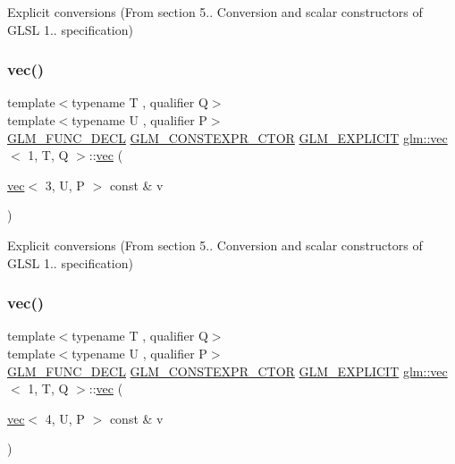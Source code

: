 Explicit conversions (From section 5.. Conversion and scalar constructors of G\+L\+SL 1.. specification) 

\mbox{\label{structglm_1_1vec_3_011_00_01_t_00_01_q_01_4_ab2af72d32392be4ad056d846d6552a85}} 
\subsubsection{\texorpdfstring{vec()}{vec()}\hspace{0.1cm}{\footnotesize\ttfamily [6/14]}}
{\footnotesize\ttfamily template$<$typename T , qualifier Q$>$ \\
template$<$typename U , qualifier P$>$ \\
\hyperlink{setup_8hpp_ab2d052de21a70539923e9bcbf6e83a51}{G\+L\+M\+\_\+\+F\+U\+N\+C\+\_\+\+D\+E\+CL} \hyperlink{setup_8hpp_ad34178a09666081abdb573c14d1f4a5a}{G\+L\+M\+\_\+\+C\+O\+N\+S\+T\+E\+X\+P\+R\+\_\+\+C\+T\+OR} \hyperlink{setup_8hpp_a6c74f5a5e7b134ab69023ff9a30d4d5d}{G\+L\+M\+\_\+\+E\+X\+P\+L\+I\+C\+IT} \hyperlink{structglm_1_1vec}{glm\+::vec}$<$ 1, T, Q $>$\+::\hyperlink{structglm_1_1vec}{vec} (\begin{DoxyParamCaption}\item[{\hyperlink{structglm_1_1vec}{vec}$<$ 3, U, P $>$ const \&}]{v }\end{DoxyParamCaption})}



Explicit conversions (From section 5.. Conversion and scalar constructors of G\+L\+SL 1.. specification) 

\mbox{\label{structglm_1_1vec_3_011_00_01_t_00_01_q_01_4_afe3da36b0ef8bf292c65f2846dc6db9a}} 
\subsubsection{\texorpdfstring{vec()}{vec()}\hspace{0.1cm}{\footnotesize\ttfamily [7/14]}}
{\footnotesize\ttfamily template$<$typename T , qualifier Q$>$ \\
template$<$typename U , qualifier P$>$ \\
\hyperlink{setup_8hpp_ab2d052de21a70539923e9bcbf6e83a51}{G\+L\+M\+\_\+\+F\+U\+N\+C\+\_\+\+D\+E\+CL} \hyperlink{setup_8hpp_ad34178a09666081abdb573c14d1f4a5a}{G\+L\+M\+\_\+\+C\+O\+N\+S\+T\+E\+X\+P\+R\+\_\+\+C\+T\+OR} \hyperlink{setup_8hpp_a6c74f5a5e7b134ab69023ff9a30d4d5d}{G\+L\+M\+\_\+\+E\+X\+P\+L\+I\+C\+IT} \hyperlink{structglm_1_1vec}{glm\+::vec}$<$ 1, T, Q $>$\+::\hyperlink{structglm_1_1vec}{vec} (\begin{DoxyParamCaption}\item[{\hyperlink{structglm_1_1vec}{vec}$<$ 4, U, P $>$ const \&}]{v }\end{DoxyParamCaption})}



